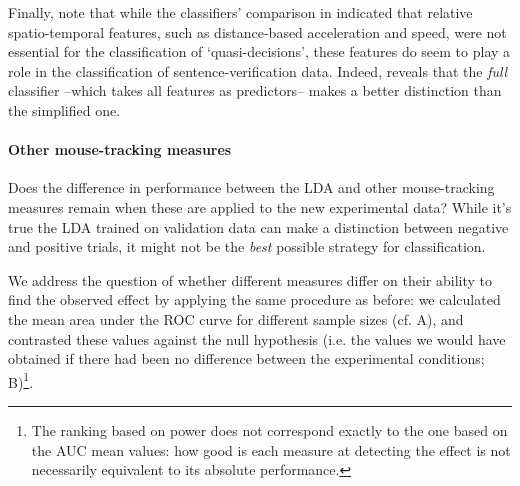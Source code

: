 \documentclass{article}
\begin{document}
Finally, note that while the classifiers' comparison in  indicated that relative spatio-temporal features, such as distance-based acceleration and speed, were not essential for the classification of `quasi-decisions', these features do seem to play a role in the classification of sentence-verification data. Indeed,  reveals that the \emph{full} classifier --which takes all features as predictors-- makes a better distinction than the simplified one.   

\paragraph{Other mouse-tracking measures}
Does the difference in performance between the LDA and other mouse-tracking measures remain when these are applied to the new experimental data?
While it's true the LDA trained on validation data can make a distinction between negative and positive trials, it might not be the \emph{best} possible strategy for classification. 


We address the question of whether different measures differ on their ability to find the observed effect by applying the same procedure as before: we calculated the mean area under the ROC curve for different sample sizes (cf. A), and contrasted these values against the null hypothesis (i.e. the values we would have obtained if there had been no difference between the experimental conditions; B)\footnote{The ranking based on power does not correspond exactly to the one based on the AUC mean values: how good is each measure at detecting the effect is not necessarily equivalent to its absolute performance.}. 
\end{document}
